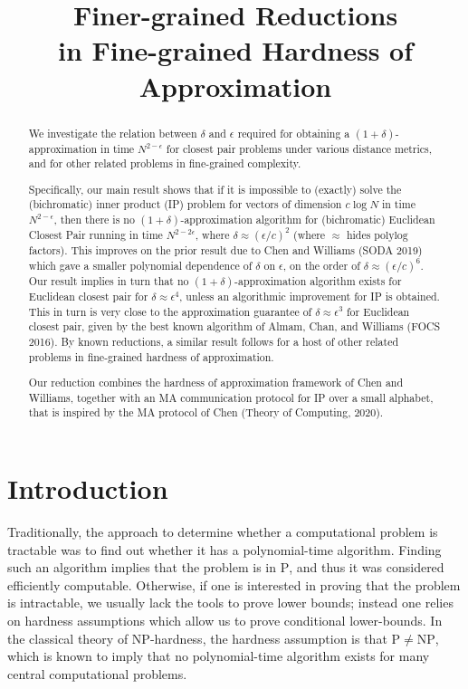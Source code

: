 \documentclass[11pt]{article}
\title{Finer-grained Reductions \\ in Fine-grained Hardness of Approximation}
\author{
Elie Abboud {\hskip 5em\relax}
Noga Ron-Zewi\thanks{Research of both authors supported in part
    by ISF grant 735/20 and by the European Union (ERC, ECCC, 101076663). Views and opinions expressed are however those of the author(s) only and do not necessarily reflect those of the European Union or the European Research Council. Neither the European Union nor the granting authority can be held responsible for them.} \\ 
Department of Computer Science, University of Haifa \\ \texttt{}\qquad  \texttt{eliabboud1000@gmail.com, noga@cs.haifa.ac.il}
}
\date{}
\theoremstyle{plain}
\theoremstyle{remark}
\newcommand{\polytime}{\mathrm{P}}
\newcommand{\NP}{\mathrm{NP}}
\newcommand{\polylog}{\mathrm{polylog}}
\begin{document}
 
\maketitle

\begin{abstract}

We investigate the relation between $\delta$ and $\epsilon$ required for obtaining a $(1+\delta)$-approximation in time $N^{2-\epsilon}$ for closest pair problems under various distance metrics, and for other related problems in fine-grained complexity. 

Specifically, our main result shows that  if it is impossible to (exactly) solve the  (bichromatic) inner product (IP) problem for vectors of dimension $c \log N$ in time $N^{2-\epsilon}$, then there is no 
$(1+\delta)$-approximation algorithm for (bichromatic) Euclidean Closest Pair running in time $N^{2-2\epsilon}$, where 
$\delta \approx (\epsilon/c)^2$ (where $\approx$ hides $\polylog$ factors). This improves on the prior result due to Chen and Williams (SODA 2019) which gave a smaller polynomial dependence  of $\delta$ on $\epsilon$, on the order of $\delta \approx (\epsilon/c)^6$.
Our result implies in turn that no $(1+\delta)$-approximation algorithm exists for Euclidean closest pair for $\delta \approx \epsilon^4$,  unless an algorithmic improvement for IP is obtained. This in turn is  very close to the  approximation guarantee of $\delta \approx \epsilon^3$ for  Euclidean closest pair, given by the best known algorithm of Almam, Chan, and Williams (FOCS 2016).
By known reductions, a similar result follows for a host of other related problems in fine-grained hardness of approximation. 

Our reduction combines the hardness of approximation framework of Chen and Williams, together with an MA communication protocol for IP over a small alphabet, that is inspired by the MA protocol of Chen (Theory of Computing, 2020).
\end{abstract}

\section{Introduction}\label{sec:intro}



Traditionally, the approach to determine whether a computational problem is tractable was to find out whether
it has a polynomial-time algorithm. Finding such an algorithm implies that the problem is in $\polytime$,
and thus it was considered efficiently computable. Otherwise, if one is interested
in proving that the problem is intractable, we usually lack
the tools to prove lower bounds; instead one relies on hardness assumptions 
which allow us to prove conditional lower-bounds. 
In the classical theory of $\NP$-hardness, the hardness assumption is that $\polytime \neq \NP$, which is known to imply that no polynomial-time algorithm exists for many central computational problems.
\end{document}
